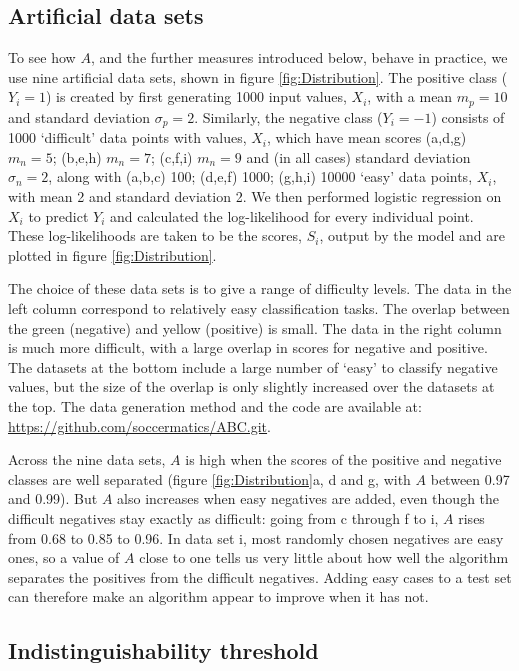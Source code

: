 \documentclass[preprint,12pt]{article}
\begin{document}
\subsection*{Artificial data sets}

To see how $A$, and the further measures introduced below, behave in practice, we use nine artificial data sets, shown in figure \ref{fig:Distribution}. The positive class ($Y_i=1$) is created by first generating 1000 input values, $X_i$, with a mean $m_p=10$ and standard deviation $\sigma_p=2$. Similarly, the negative class ($Y_i=-1$) consists of 1000 `difficult' data points with values, $X_i$, which have mean scores (a,d,g) $m_n=5$; (b,e,h) $m_n=7$; (c,f,i) $m_n=9$ and (in all cases) standard deviation $\sigma_n=2$, along with (a,b,c) 100; (d,e,f) 1000; (g,h,i) 10000 `easy' data points, $X_i$, with mean 2 and standard deviation 2.  We then performed logistic regression on $X_i$ to predict $Y_i$ and calculated the log-likelihood for every individual point. These log-likelihoods are taken to be the scores, $S_i$, output by the model and are plotted in figure \ref{fig:Distribution}. 

The choice of these data sets is to give a range of difficulty levels. The data in the left column correspond to relatively easy classification tasks. The overlap between the green (negative) and yellow (positive) is small. The data in the right column is much more difficult, with a large overlap in scores for negative and positive. The datasets at the bottom include a large number of `easy' to classify negative values, but the size of the overlap is only slightly increased over the datasets at the top. The data generation method and the code are available at: \href{https://github.com/soccermatics/ABC.git}{https://github.com/soccermatics/ABC.git}.

Across the nine data sets, $A$ is high when the scores of the positive and negative classes are well separated (figure \ref{fig:Distribution}a, d and g, with $A$ between 0.97 and 0.99). But $A$ also increases when easy negatives are added, even though the difficult negatives stay exactly as difficult: going from c through f to i, $A$ rises from 0.68 to 0.85 to 0.96. In data set i, most randomly chosen negatives are easy ones, so a value of $A$ close to one tells us very little about how well the algorithm separates the positives from the difficult negatives. Adding easy cases to a test set can therefore make an algorithm appear to improve when it has not.

\subsection*{Indistinguishability threshold}
\end{document}
